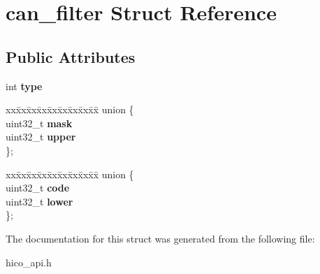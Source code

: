 \hypertarget{structcan__filter}{}\section{can\+\_\+filter Struct Reference}
\label{structcan__filter}
\subsection*{Public Attributes}
\begin{DoxyCompactItemize}
\item 
\mbox{\label{structcan__filter_a796cdd0845b3b22c44028a898938d3e0}} 
int {\bfseries type}
\item 
\mbox{\label{structcan__filter_a148b8cfca47da3ad5d4b0d248f23f4db}} 
\begin{tabbing}
xx\=xx\=xx\=xx\=xx\=xx\=xx\=xx\=xx\=\kill
union \{\\
\>uint32\_t {\bfseries mask}\\
\>uint32\_t {\bfseries upper}\\
\}; \\

\end{tabbing}\item 
\mbox{\label{structcan__filter_a8d1330693fbaf7c38816e8b04383fbe9}} 
\begin{tabbing}
xx\=xx\=xx\=xx\=xx\=xx\=xx\=xx\=xx\=\kill
union \{\\
\>uint32\_t {\bfseries code}\\
\>uint32\_t {\bfseries lower}\\
\}; \\

\end{tabbing}\end{DoxyCompactItemize}


The documentation for this struct was generated from the following file\+:\begin{DoxyCompactItemize}
\item 
hico\+\_\+api.\+h\end{DoxyCompactItemize}
